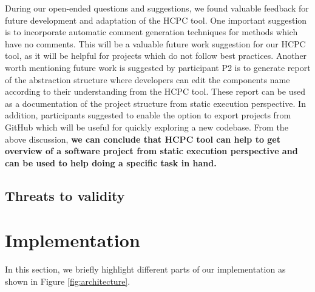 During our open-ended questions and suggestions, we found valuable feedback for future development and adaptation of the HCPC tool. One important suggestion is to incorporate automatic comment generation techniques for methods which have no comments. This will be a valuable future work suggestion for our HCPC tool, as it will be helpful for projects which do not follow best practices. Another worth mentioning future work is suggested by participant P2 is to generate report of the abstraction structure where developers can edit the components name according to their understanding from the HCPC tool. These report can be used as a documentation of the project structure from static execution perspective. In addition, participants suggested to enable the option to export projects from GitHub which will be useful for quickly exploring a new codebase. From the above discussion, \textbf{we can conclude that HCPC tool can help to get overview of a software project from static execution perspective and can be used to help doing a specific task in hand.}




\subsection{Threats to validity}



\section{Implementation }
In this section, we briefly highlight different parts of our implementation as shown in Figure \ref{fig:architecture}.

